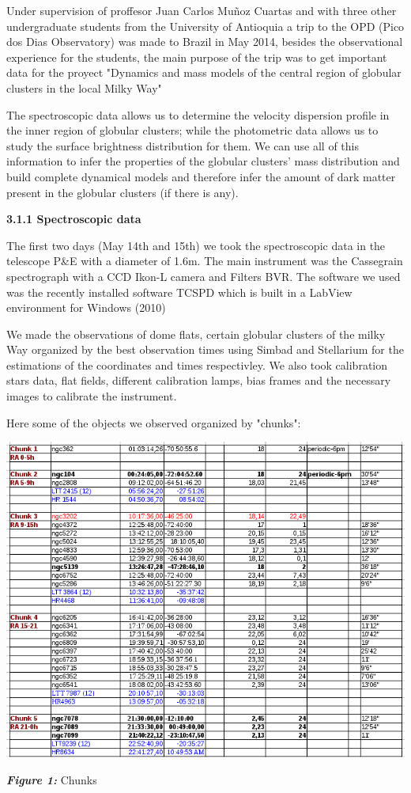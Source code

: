 \documentclass[english]{article}
\begin{document}
Under supervision of proffesor Juan Carlos Mu\~noz Cuartas and with three other undergraduate students from the University of Antioquia a trip to the OPD (Pico dos Dias Observatory) was made to Brazil in May 2014, besides the observational experience for the students, the main purpose of the trip was to get important data for the proyect "Dynamics and mass models of the central region of globular clusters in the local Milky Way"

The spectroscopic data allows us to determine the velocity dispersion profile in the inner region of globular clusters; while the photometric data allows us to study the surface brightness distribution for them. We can use all of this information to infer the properties of the globular clusters' mass distribution and build complete dynamical models and therefore infer the amount of dark matter present in the globular clusters (if there is any).

\textbf{{\large 3.1.1 Spectroscopic data}}

The first two days (May 14th and 15th) we took the spectroscopic data in the telescope P\&E with a diameter of 1.6m. The main instrument was the Cassegrain spectrograph with a CCD Ikon-L camera and Filters BVR. The software we used was the recently installed software TCSPD which is built in a LabView environment for Windows (2010)

We made the observations of dome flats, certain globular clusters of the milky Way organized by the best observation times using Simbad and Stellarium for the estimations of the coordinates and times respectivley. We also took calibration stars data, flat fields, different calibration lamps, bias frames and the necessary images to calibrate the instrument.

Here some of the objects we observed organized by "chunks":

\begin{center}
\includegraphics[scale=0.5]{9.png}

\textit{\textbf{Figure 1:}} Chunks
\end{center}
\end{document}
